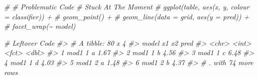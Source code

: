 \documentclass[
]{article}
\newenvironment{Shaded}{\begin{snugshade}}{\end{snugshade}}
\newcommand{\CommentTok}[1]{\textcolor[rgb]{0.56,0.35,0.01}{\textit{#1}}}
\begin{document}
\begin{Shaded}
\begin{Highlighting}[]
\CommentTok{\# \# Problematic Code }
\CommentTok{\# Stuck At The Moment}
\CommentTok{\# ggplot(table, aes(x, y, colour = classifier)) + }
\CommentTok{\#   geom\_point() + }
\CommentTok{\#   geom\_line(data = grid, aes(y = pred)) + }
\CommentTok{\#   facet\_wrap(\textasciitilde{} model)}


\CommentTok{\# Leftover Code}
\CommentTok{\#\textgreater{} \# A tibble: 80 x 4}
\CommentTok{\#\textgreater{}   model    x1 x2     pred}
\CommentTok{\#\textgreater{}   \textless{}chr\textgreater{} \textless{}int\textgreater{} \textless{}fct\textgreater{} \textless{}dbl\textgreater{}}
\CommentTok{\#\textgreater{} 1 mod1      1 a      1.67}
\CommentTok{\#\textgreater{} 2 mod1      1 b      4.56}
\CommentTok{\#\textgreater{} 3 mod1      1 c      6.48}
\CommentTok{\#\textgreater{} 4 mod1      1 d      4.03}
\CommentTok{\#\textgreater{} 5 mod1      2 a      1.48}
\CommentTok{\#\textgreater{} 6 mod1      2 b      4.37}
\CommentTok{\#\textgreater{} \# . with 74 more rows}


\end{Highlighting}
\end{Shaded}
\end{document}
